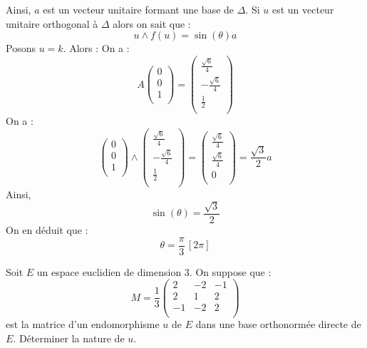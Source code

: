 \documentclass[a4paper,10pt]{report}
\begin{document}
\begin{enumerate}
Ainsi, $a$ est un vecteur unitaire formant une base de $\Delta$. Si $u$ est un vecteur unitaire orthogonal à $\Delta$ alors on sait que :
$$ u \wedge f(u) = \sin(\theta) a$$
Posons $u=k$. Alors :
On a :
$$ A \begin{pmatrix}
0 \\
0 \\
1 \\
\end{pmatrix} = \begin{pmatrix}
 \tfrac{\sqrt{6}}{4} \\
 -\tfrac{\sqrt{6}}{4} \\
 \tfrac{1}{2} \\
\end{pmatrix}$$
On a :
$$ 
\begin{pmatrix}
0 \\
0 \\
1 \\
\end{pmatrix} \wedge \begin{pmatrix}
 \tfrac{\sqrt{6}}{4} \\
 -\tfrac{\sqrt{6}}{4} \\
 \tfrac{1}{2} \\
\end{pmatrix} = \begin{pmatrix}
\tfrac{\sqrt{6}}{4}\\
\tfrac{\sqrt{6}}{4} \\
0 \\
\end{pmatrix} = \dfrac{\sqrt{3}}{2} a$$
Ainsi,
$$\sin(\theta)=\frac{\sqrt{3}}{2}$$
On en déduit que :
$$\theta=\dfrac{\pi}{3} \, [2\pi]$$
\end{enumerate}


\begin{Exa} Soit $E$ un espace euclidien de dimension $3$. On suppose que :
$$ M = \dfrac{1}{3} \begin{pmatrix}
2 & -2 & -1 \\
2 & 1 & 2 \\
-1 & -2 & 2 \\
\end{pmatrix}$$
est la matrice d'un endomorphisme $u$ de $E$ dans une base orthonormée directe de $E$. Déterminer la nature de $u$.
\end{Exa}
\end{document}
